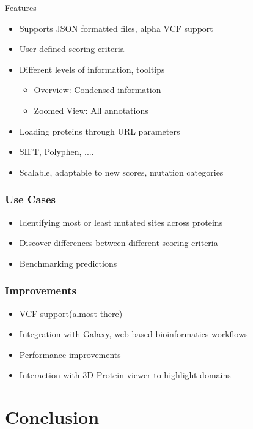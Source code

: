 \documentclass[10pt, compress]{beamer}
\renewcommand{\(}{\begin{columns}}
\renewcommand{\)}{\end{columns}}
\newcommand{\<}[1]{\begin{column}{#1}}
\renewcommand{\>}{\end{column}}
\begin{document}
\begin{frame}{Features}
\begin{itemize}[<+- | alert@+>]
\item Supports JSON formatted files, alpha VCF support
\item User defined scoring criteria
\item Different levels of information, tooltips
\begin{itemize}
\item Overview: Condensed information
\item Zoomed View: All annotations 
\end{itemize}
\item Loading proteins through URL parameters
\item SIFT, Polyphen, ....
\item Scalable, adaptable to new scores, mutation categories

\end{itemize}
\end{frame}

\begin{frame}
\frametitle{Use Cases}
\begin{itemize}[<+- | alert@+>]
\item Identifying most or least mutated sites across proteins
\item Discover differences between different scoring criteria
\item Benchmarking predictions
\end{itemize}

\end{frame}

\begin{frame}
\frametitle{Improvements}
\begin{itemize}[<+- | alert@+>]
\item VCF support(almost there)
\item Integration with Galaxy, web based bioinformatics workflows
\item Performance improvements
\item Interaction with 3D Protein viewer to highlight domains
\end{itemize}
\end{frame}

\section{Conclusion}
\end{document}

